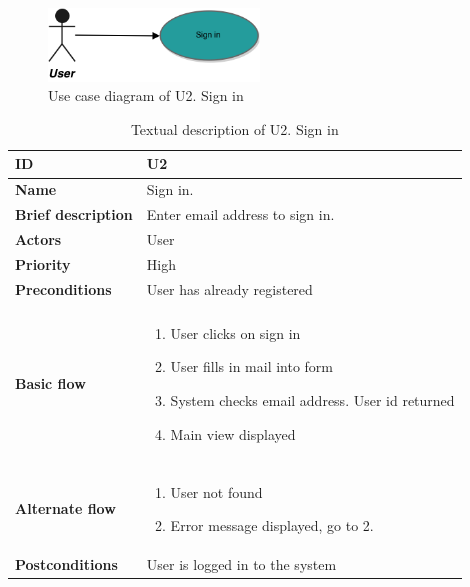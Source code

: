 \begin{figure}[hp]
	\includegraphics[width=0.5\textwidth]{fig/U2}
	\centering
	\caption{Use case diagram of U2. Sign in}
	\label{Fig:U2}
\end{figure}

\begin{table}[hp]
	\renewcommand{\arraystretch}{1.5}
	\centering
	\caption{Textual description of U2. Sign in}
	\begin{tabular}[b]{|l | l|}\hline
		\textbf{ID} 				& U2									\\\hline
		\textbf{Name} 				& Sign in.								\\\hline
		\textbf{Brief description}	& Enter email address to sign in. 		\\\hline
		\textbf{Actors} 			& User									\\\hline
		\textbf{Priority}			& High									\\\hline
		\textbf{Preconditions}		& User has already registered			\\\hline&\\[-2ex]
		\textbf{Basic flow}			& \begin{minipage}{5in}
			\begin{enumerate}[noitemsep]
				\item User clicks on sign in
				\item User fills in mail into form
				\item System checks email address. User id returned
				\item Main view displayed
			\end{enumerate}						
		\end{minipage}						\\\hline&\\[-2ex]
		\textbf{Alternate flow}		& \begin{minipage}{5in}
			\begin{enumerate}[noitemsep]
				\item User not found
				\item Error message displayed, go to 2.
			\end{enumerate}
		\end{minipage}							\\\hline
		\textbf{Postconditions}		& User is logged in to the system\\\hline
	\end{tabular}
	\label{Tab:U2}
\end{table}

